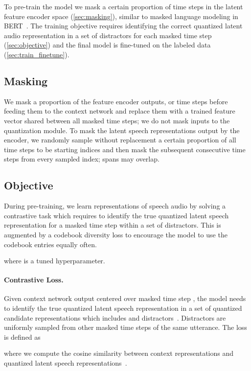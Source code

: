 \documentclass{article}
\begin{document}
To pre-train the model we mask a certain proportion of time steps in the latent feature encoder space (\autoref{sec:masking}), similar to masked language modeling in BERT~\citep{devlin2018bert}.
The training objective requires identifying the correct quantized latent audio representation in a set of distractors for each masked time step (\autoref{sec:objective}) and the final model is fine-tuned on the labeled data (\autoref{sec:train_finetune}).


\subsection{Masking}
\label{sec:masking}
We mask a proportion of the feature encoder outputs, or time steps before feeding them to the context network and replace them with a trained feature vector shared between all masked time steps;
we do not mask inputs to the quantization module.
To mask the latent speech representations output by the encoder, we randomly sample without replacement a certain proportion  of all time steps to be starting indices and then mask the subsequent  consecutive time steps from every sampled index; spans may overlap. 


\subsection{Objective}
\label{sec:objective}

During pre-training, we learn representations of speech audio by solving a contrastive task  which requires to identify the true quantized latent speech representation for a masked time step within a set of distractors.
This is augmented by a codebook diversity loss  to encourage the model to use the codebook entries equally often. 

where  is a tuned hyperparameter.

\paragraph{Contrastive Loss.}
Given context network output  centered over masked time step , the model needs to identify the true quantized latent speech representation  in a set of  quantized candidate representations  which includes  and  distractors~\citep{gutmann2010aistats,oord2018cpc}.
Distractors are uniformly sampled from other masked time steps of the same utterance. The loss is defined as

where we compute the cosine similarity  between context representations and quantized latent speech representations~\citep{he2019momentum,chen2020simple}.
\end{document}
